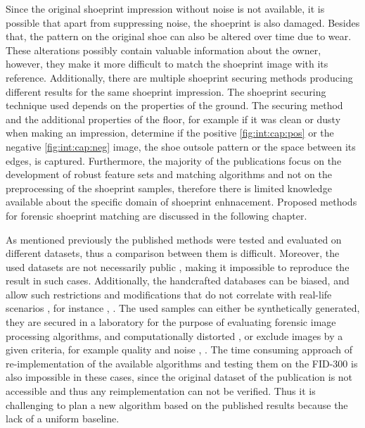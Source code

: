 \documentclass[draft,final]{vutinfth} %
\begin{document}
Since the original shoeprint impression without noise is not available, it is possible that apart from suppressing noise, the shoeprint is also damaged.
Besides that, the pattern on the original shoe can also be altered over time due to wear.
These alterations possibly contain valuable information about the owner, however, they make it more difficult to match the shoeprint image with its reference.
Additionally, there are multiple shoeprint securing methods producing different results for the same shoeprint impression\cite{katireddy2017novel}. 
The shoeprint securing technique used depends on the properties of the ground. 
The securing method and the additional properties of the floor, for example if it was clean or dusty when making an impression, determine if the positive \ref{fig:int:cap:pos} or the negative \ref{fig:int:cap:neg} image, the shoe outsole pattern or the space between its edges, is captured.
Furthermore, the majority of the publications focus on the development of robust feature sets and matching algorithms and not on the preprocessing of the shoeprint samples, therefore there  is limited knowledge available about the specific domain of shoeprint enhnacement.
Proposed methods for forensic shoeprint matching are discussed in the following chapter.
\par
As mentioned previously the published methods were tested and evaluated on different datasets, thus a comparison between them is difficult.
Moreover, the used datasets are not necessarily public \cite{katireddy2017novel}, \cite{dardi2009texture} making it impossible to reproduce the result in such cases.
Additionally, the handcrafted databases can be biased, and allow such restrictions and modifications that do not correlate with real-life scenarios \cite{rida2019forensic}, for instance \cite{dardi2009texture}, \cite{tang2010footwear}.
The used samples can either be synthetically generated, they are secured in a laboratory for the purpose of evaluating forensic image processing algorithms, and computationally distorted \cite{de2005automated}, \cite{gueham2008automatic} or exclude images by a given criteria, for example quality and noise \cite{dardi2009texture}, \cite{tang2010footwear}.
The time consuming approach of re-implementation of the available algorithms and testing them on the FID-300 is also impossible in these cases, since the original dataset of the publication is not accessible and thus any reimplementation can not be verified.
Thus it is challenging to plan a new algorithm based on the published results because the lack of a uniform baseline.
\end{document}
